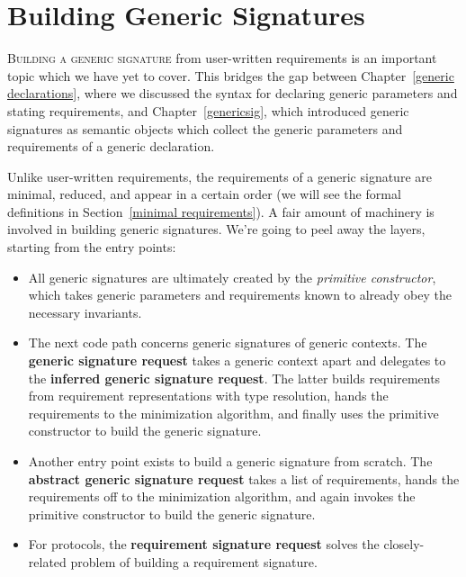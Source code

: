 \documentclass[../generics]{subfiles}
\begin{document}
\chapter{Building Generic Signatures}\label{building generic signatures}

\lettrine{B}{uilding a generic signature} from user-written requirements is an important topic which we have yet to cover. This bridges the gap between Chapter~\ref{generic declarations}, where we discussed the syntax for declaring generic parameters and stating requirements, and Chapter~\ref{genericsig}, which introduced generic signatures as semantic objects which collect the generic parameters and requirements of a generic declaration.

Unlike user-written requirements, the requirements of a generic signature are minimal, reduced, and appear in a certain order (we will see the formal definitions in Section~\ref{minimal requirements}). A fair amount of machinery is involved in building generic signatures. We're going to peel away the layers, starting from the entry points:
\begin{itemize}
\item All generic signatures are ultimately created by the \emph{primitive constructor}, which takes generic parameters and requirements known to already obey the necessary invariants.
\item The next code path concerns generic signatures of generic contexts. The \textbf{generic signature request} takes a generic context apart and delegates to the \textbf{inferred generic signature request}. The latter builds requirements from requirement representations with type resolution, hands the requirements to the minimization algorithm, and finally uses the primitive constructor to build the generic signature.
\item Another entry point exists to build a generic signature from scratch. The \textbf{abstract generic signature request} takes a list of requirements, hands the requirements off to the minimization algorithm, and again invokes the primitive constructor to build the generic signature.
\item For protocols, the \textbf{requirement signature request} solves the closely-related problem of building a requirement signature.
\end{itemize}
\end{document}
